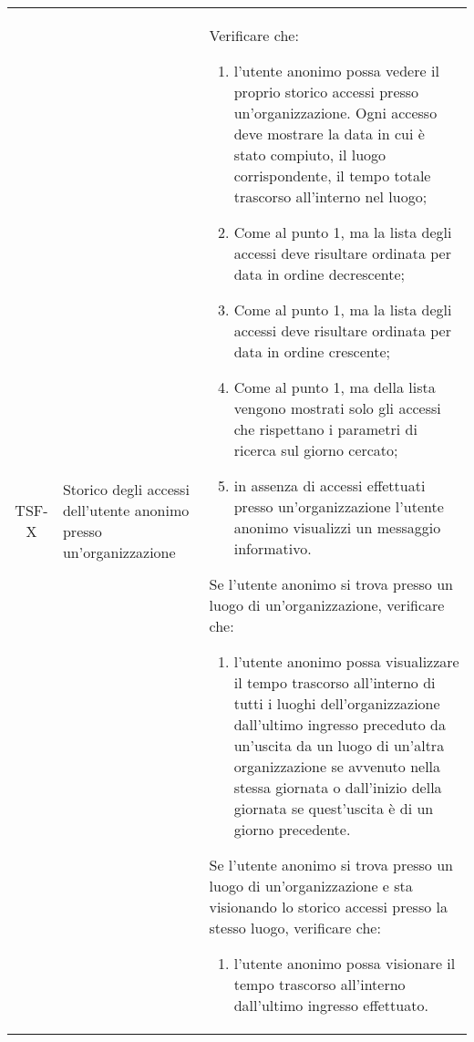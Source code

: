 {\begin{longtable}{ c | C{3cm} | C{11cm} }
TSF-X & Storico degli accessi dell'utente anonimo presso un'organizzazione & 
Verificare che:
\begin{enumerate}
    \item l'utente anonimo possa vedere il proprio storico accessi presso un'organizzazione. Ogni accesso deve mostrare la data in cui è stato compiuto, il luogo corrispondente, il tempo totale trascorso all'interno nel luogo;
    \item Come al punto 1, ma la lista degli accessi deve risultare ordinata per data in ordine decrescente;
    \item Come al punto 1, ma la lista degli accessi deve risultare ordinata per data in ordine crescente;
    \item Come al punto 1, ma della lista vengono mostrati solo gli accessi che rispettano i parametri di ricerca sul giorno cercato;
    \item in assenza di accessi effettuati presso un'organizzazione l'utente anonimo visualizzi un messaggio informativo.
\end{enumerate}
Se l'utente anonimo si trova presso un luogo di un'organizzazione, verificare che:
\begin{enumerate}
    \item l'utente anonimo possa visualizzare il tempo trascorso all'interno di tutti i luoghi dell'organizzazione dall'ultimo ingresso preceduto da un'uscita da un luogo di un'altra organizzazione se avvenuto nella stessa giornata o dall'inizio della giornata se quest'uscita è di un giorno precedente. %
\end{enumerate}
Se l'utente anonimo si trova presso un luogo di un'organizzazione e sta visionando lo storico accessi presso la stesso luogo, verificare che:
\begin{enumerate}
    \item l'utente anonimo possa visionare il tempo trascorso all'interno dall'ultimo ingresso effettuato.
\end{enumerate} \\


\end{longtable}}
